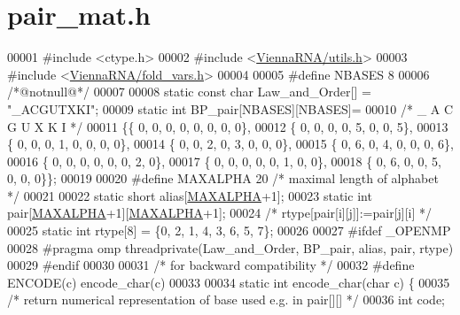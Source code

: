 \hypertarget{pair__mat_8h_source}{\section{pair\+\_\+mat.\+h}
\label{pair__mat_8h_source}
}

\begin{DoxyCode}
00001 \textcolor{preprocessor}{#include <ctype.h>}
00002 \textcolor{preprocessor}{#include <\hyperlink{utils_8h}{ViennaRNA/utils.h}>}
00003 \textcolor{preprocessor}{#include <\hyperlink{fold__vars_8h}{ViennaRNA/fold\_vars.h}>}
00004 
00005 \textcolor{preprocessor}{#define NBASES 8}
00006 \textcolor{comment}{/*@notnull@*/}
00007 
00008 \textcolor{keyword}{static} \textcolor{keyword}{const} \textcolor{keywordtype}{char} Law\_and\_Order[] = \textcolor{stringliteral}{"\_ACGUTXKI"};
00009 \textcolor{keyword}{static} \textcolor{keywordtype}{int} BP\_pair[NBASES][NBASES]=
00010 \textcolor{comment}{/* \_  A  C  G  U  X  K  I */}
00011 \{\{ 0, 0, 0, 0, 0, 0, 0, 0\},
00012  \{ 0, 0, 0, 0, 5, 0, 0, 5\},
00013  \{ 0, 0, 0, 1, 0, 0, 0, 0\},
00014  \{ 0, 0, 2, 0, 3, 0, 0, 0\},
00015  \{ 0, 6, 0, 4, 0, 0, 0, 6\},
00016  \{ 0, 0, 0, 0, 0, 0, 2, 0\},
00017  \{ 0, 0, 0, 0, 0, 1, 0, 0\},
00018  \{ 0, 6, 0, 0, 5, 0, 0, 0\}\};
00019 
00020 \textcolor{preprocessor}{#define MAXALPHA 20       }\textcolor{comment}{/* maximal length of alphabet */}\textcolor{preprocessor}{}
00021 
00022 \textcolor{keyword}{static} \textcolor{keywordtype}{short} alias[\hyperlink{group__model__details_ga05a5ffe718aa431d97419a12fb082379}{MAXALPHA}+1];
00023 \textcolor{keyword}{static} \textcolor{keywordtype}{int} pair[\hyperlink{group__model__details_ga05a5ffe718aa431d97419a12fb082379}{MAXALPHA}+1][\hyperlink{group__model__details_ga05a5ffe718aa431d97419a12fb082379}{MAXALPHA}+1];
00024 \textcolor{comment}{/* rtype[pair[i][j]]:=pair[j][i] */}
00025 \textcolor{keyword}{static} \textcolor{keywordtype}{int} rtype[8] = \{0, 2, 1, 4, 3, 6, 5, 7\};
00026 
00027 \textcolor{preprocessor}{#ifdef \_OPENMP}
00028 \textcolor{preprocessor}{#pragma omp threadprivate(Law\_and\_Order, BP\_pair, alias, pair, rtype)}
00029 \textcolor{preprocessor}{#endif}
00030 
00031 \textcolor{comment}{/* for backward compatibility */}
00032 \textcolor{preprocessor}{#define ENCODE(c) encode\_char(c)}
00033 
00034 \textcolor{keyword}{static} \textcolor{keywordtype}{int} encode\_char(\textcolor{keywordtype}{char} c) \{
00035   \textcolor{comment}{/* return numerical representation of base used e.g. in pair[][] */}
00036   \textcolor{keywordtype}{int} code;

\end{DoxyCode}
